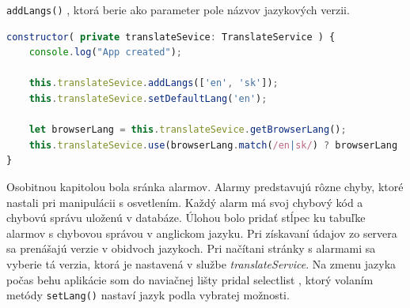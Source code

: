 \documentclass[11pt, oneside]{report}
\begin{document}
\lstinline!addLangs()! , ktorá berie ako parameter pole názvov jazykových verzii.
\begin{lstlisting}[language=Javascript,showstringspaces=false, caption=Nastavenie jazyka v konštruktore,captionpos=b]
constructor( private translateSevice: TranslateService ) {
    console.log("App created");
	
    this.translateSevice.addLangs(['en', 'sk']);
    this.translateSevice.setDefaultLang('en');
	
    let browserLang = this.translateSevice.getBrowserLang();
    this.translateSevice.use(browserLang.match(/en|sk/) ? browserLang : 'en');
}
\end{lstlisting}
Osobitnou kapitolou bola sránka alarmov. Alarmy predstavujú  rôzne chyby, ktoré nastali pri manipulácii s osvetlením. Každý alarm má svoj chybový kód a  chybovú správu uloženú v databáze. Úlohou bolo  pridať stĺpec ku tabuľke alarmov  s chybovou  správou v anglickom jazyku. Pri získavaní údajov zo servera sa prenášajú   verzie v obidvoch jazykoch. Pri načítani stránky s alarmami sa vyberie tá verzia, ktorá je nastavená v službe \textit{translateService}. Na zmenu jazyka počas behu aplikácie som do naviačnej lišty pridal selectlist , ktorý  volaním metódy %
\lstinline!setLang()! nastaví jazyk podla  vybratej možnosti.
\end{document}
